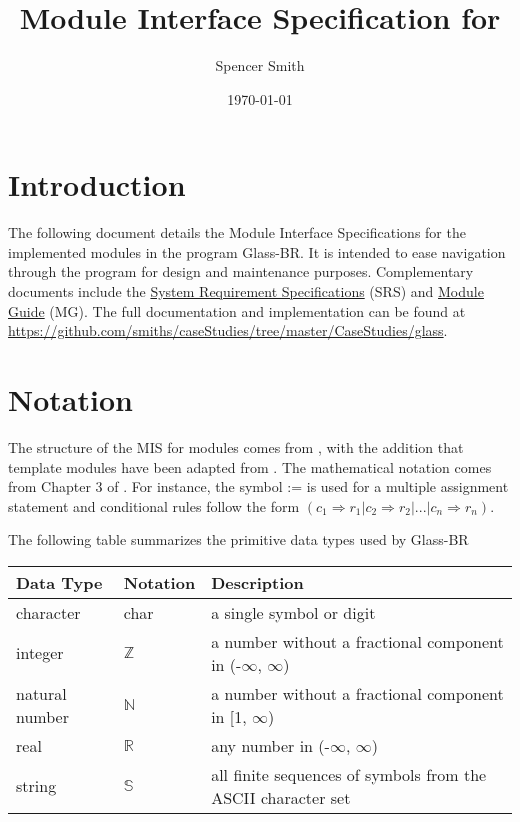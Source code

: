 \documentclass[12pt, titlepage]{article}
\newcommand{\progname}[1]{Glass-BR}
\begin{document}
\title{Module Interface Specification for \progname} 
\author{Spencer Smith}
\date{\today}

\maketitle

\tableofcontents

\newpage

\section{Introduction}

The following document details the Module Interface Specifications for the
implemented modules in the program \progname{}. It is intended to ease navigation
through the program for design and maintenance purposes.  Complementary
documents include the \href{../SRS/glassbr_srs.pdf}{System Requirement
  Specifications} (SRS) and \href{../MG/glassbr_mg.pdf}{Module Guide} (MG).  The
full documentation and implementation can be found at
\url{https://github.com/smiths/caseStudies/tree/master/CaseStudies/glass}.

\section{Notation}

The structure of the MIS for modules comes from \citet{HoffmanAndStrooper1995},
with the addition that template modules have been adapted from
\cite{GhezziEtAl2003}.  The mathematical notation comes from Chapter 3 of
\citet{HoffmanAndStrooper1995}.  For instance, the symbol := is used for a
multiple assignment statement and conditional rules follow the form $(c_1
\Rightarrow r_1 | c_2 \Rightarrow r_2 | ... | c_n \Rightarrow r_n )$.

The following table summarizes the primitive data types used by \progname. 

\begin{center}
\renewcommand{\arraystretch}{1.2}
\noindent 
\begin{tabular}{l l p{7.5cm}} 
\toprule 
\textbf{Data Type} & \textbf{Notation} & \textbf{Description}\\ 
\midrule
character & char & a single symbol or digit\\
integer & $\mathbb{Z}$ & a number without a fractional component in (-$\infty$, $\infty$) \\
natural number & $\mathbb{N}$ & a number without a fractional component in [1, $\infty$) \\
real & $\mathbb{R}$ & any number in (-$\infty$, $\infty$)\\
string & $\mathbb{S}$ & all finite sequences of symbols from the ASCII character set\\
\bottomrule
\end{tabular} 
\end{center}
\end{document}
